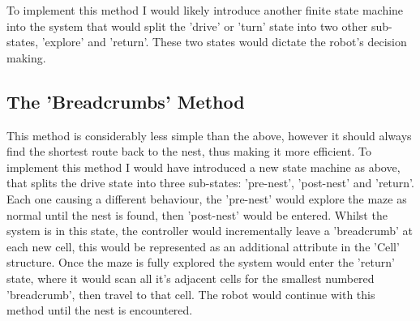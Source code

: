 \documentclass[a4paper]{article}
\begin{document}
	To implement this method I would likely introduce another finite state machine into the system that would split the 'drive' or 'turn' state into two other sub-states, 'explore' and 'return'. These two states would dictate the robot's decision making.
	
	\subsection{The 'Breadcrumbs' Method}
	This method is considerably less simple than the above, however it should always find the shortest route back to the nest, thus making it more efficient. To implement this method I would have introduced a new state machine as above, that splits the drive state into three sub-states: 'pre-nest', 'post-nest' and 'return'. Each one causing a different behaviour, the 'pre-nest' would explore the maze as normal until the nest is found, then 'post-nest' would be entered. Whilst the system is in this state, the controller would incrementally leave a 'breadcrumb' at each new cell, this would be represented as an additional attribute in the 'Cell' structure. Once the maze is fully explored the system would enter the 'return' state, where it would scan all it's adjacent cells for the smallest numbered 'breadcrumb', then travel to that cell. The robot would continue with this method until the nest is encountered.
	
\end{document}
